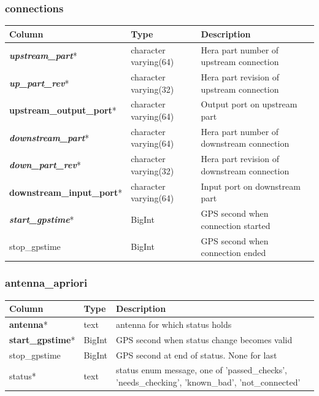 \documentclass{article}
\begin{document}
{\subsubsection{connections}
\begin{center}
\begin{tabular}{| p{4cm} | p{2cm} | p{10cm} |}
\hline
{\bf Column} & {\bf Type} & {\bf Description} \\ \hline
{\bf \em upstream\_part}* &  character varying(64) & Hera part number of upstream connection \\ \hline
{\bf \em up\_part\_rev}* & character varying(32) & Hera part revision of upstream connection \\ \hline
{\bf upstream\_output\_port}* & character varying(64) & Output port on upstream part \\ \hline
{\bf \em downstream\_part}* & character varying(64) & Hera part number of downstream connection \\ \hline
{\bf \em down\_part\_rev}* & character varying(32) & Hera part revision of downstream connection \\ \hline
{\bf downstream\_input\_port}* & character varying(64) & Input port on downstream part \\ \hline
{\bf \em start\_gpstime}* & BigInt & GPS second when connection started \\ \hline
stop\_gpstime & BigInt & GPS second when connection ended \\ \hline
\end{tabular}
\end{center}

\subsubsection{antenna\_apriori}
\begin{center}
\begin{tabular}{| p{4cm} | p{2cm} | p{10cm} |}
\hline
{\bf Column} & {\bf Type} & {\bf Description} \\ \hline
{\bf antenna}* & text & antenna for which status holds \\ \hline
{\bf start\_gpstime}* & BigInt & GPS second when status change becomes valid \\ \hline
stop\_gpstime & BigInt & GPS second at end of status.  None for last \\ \hline
status* & text & status enum message, one of 'passed\_checks', 'needs\_checking', 'known\_bad', 'not\_connected' \\ \hline
\end{tabular}
\end{center}

}
\end{document}
